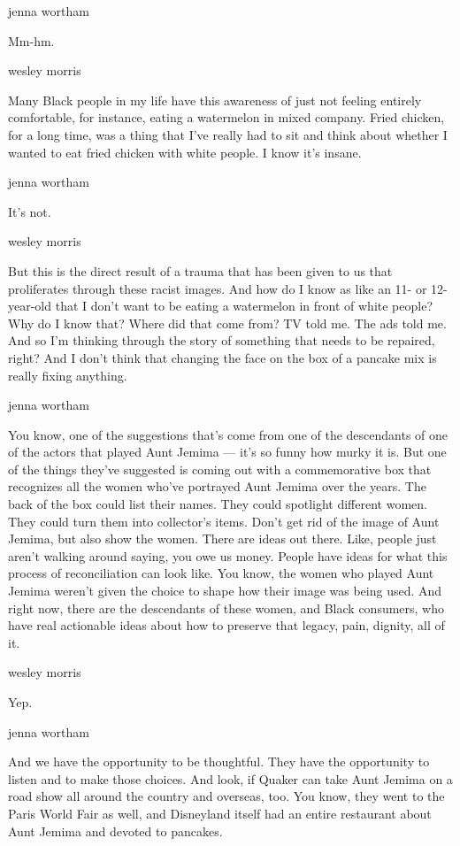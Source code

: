 jenna wortham

Mm-hm.

wesley morris

Many Black people in my life have this awareness of just not feeling
entirely comfortable, for instance, eating a watermelon in mixed
company. Fried chicken, for a long time, was a thing that I've really
had to sit and think about whether I wanted to eat fried chicken with
white people. I know it's insane.

jenna wortham

It's not.

wesley morris

But this is the direct result of a trauma that has been given to us that
proliferates through these racist images. And how do I know as like an
11- or 12-year-old that I don't want to be eating a watermelon in front
of white people? Why do I know that? Where did that come from? TV told
me. The ads told me. And so I'm thinking through the story of something
that needs to be repaired, right? And I don't think that changing the
face on the box of a pancake mix is really fixing anything.

jenna wortham

You know, one of the suggestions that's come from one of the descendants
of one of the actors that played Aunt Jemima --- it's so funny how murky
it is. But one of the things they've suggested is coming out with a
commemorative box that recognizes all the women who've portrayed Aunt
Jemima over the years. The back of the box could list their names. They
could spotlight different women. They could turn them into collector's
items. Don't get rid of the image of Aunt Jemima, but also show the
women. There are ideas out there. Like, people just aren't walking
around saying, you owe us money. People have ideas for what this process
of reconciliation can look like. You know, the women who played Aunt
Jemima weren't given the choice to shape how their image was being used.
And right now, there are the descendants of these women, and Black
consumers, who have real actionable ideas about how to preserve that
legacy, pain, dignity, all of it.

wesley morris

Yep.

jenna wortham

And we have the opportunity to be thoughtful. They have the opportunity
to listen and to make those choices. And look, if Quaker can take Aunt
Jemima on a road show all around the country and overseas, too. You
know, they went to the Paris World Fair as well, and Disneyland itself
had an entire restaurant about Aunt Jemima and devoted to pancakes.

